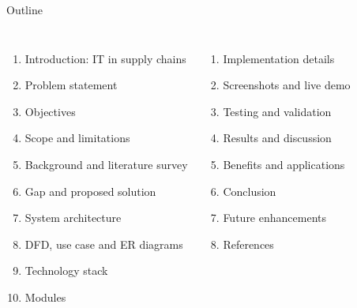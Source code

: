 \documentclass[aspectratio=169,11pt]{beamer}
\begin{document}
\begin{frame}{Outline}
\begin{columns}[T]
\begin{enumerate}\small
  \item Introduction: IT in supply chains
  \item Problem statement
  \item Objectives
  \item Scope and limitations
  \item Background and literature survey
  \item Gap and proposed solution
  \item System architecture
  \item DFD, use case and ER diagrams
  \item Technology stack
  \item Modules
\end{enumerate}
\begin{enumerate}\small\setcounter{enumi}{10}
  \item Implementation details
  \item Screenshots and live demo
  \item Testing and validation
  \item Results and discussion
  \item Benefits and applications
  \item Conclusion
  \item Future enhancements
  \item References
\end{enumerate}
\end{columns}
\end{frame}
\end{document}
